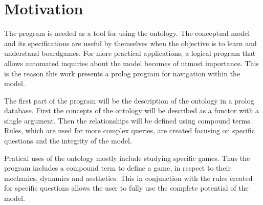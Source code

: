 \section{Motivation}

The program is needed as a tool for using the ontology. The conceptual model and its specifications are useful by themselves when the objective is to learn and understand boardgames. For more practical applications, a logical program that allows automated inquiries about the model becomes of utmost importance. This is the reason this work presents a prolog program for navigation within the model.

The first part of the program will be the description of the ontology in a prolog database. First the concepts of the ontology will be described as a functor with a single argument. Then the relationships will be defined using compound terms.  Rules, which are used for more complex queries, are created focusing on specific questions and the integrity of the model.

Pratical uses of the ontology mostly include studying specific games. Thus the program includes a compound term to define a game, in respect to their mechanics, dynamics and aesthetics. This in conjunction with the rules created for specific questions allows the user to fully use the complete potential of the model.